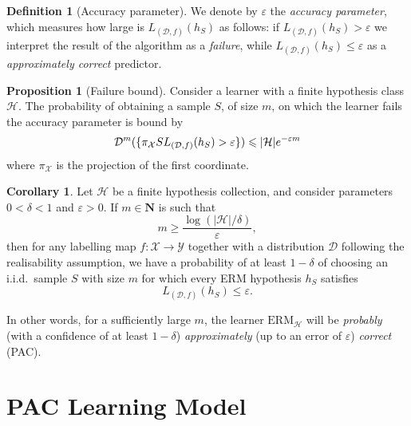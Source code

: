 \documentclass[11pt, reqno]{amsart}
\theoremstyle{definition}
\newtheorem{proposition}[theorem]{Proposition}
\newtheorem{corollary}[theorem]{Corollary}
\newtheorem{definition}[theorem]{Definition}
\renewcommand{\leq}{\leqslant}
\renewcommand{\geq}{\geqslant}
\let\colon\relax
\newcommand{\N}{\mathbf{N}}
\begin{document}
\begin{definition}[Accuracy parameter]
\label{def:accuracy-parameter}
We denote by \(\varepsilon\) the \emph{accuracy parameter}, which measures how
large is \(L_{(\mathcal{D}, f)}(h_S)\) as follows: if
\(L_{(\mathcal{D}, f)}(h_S) > \varepsilon\) we interpret the result of the
algorithm as a \emph{failure}, while
\(L_{(\mathcal{D}, f)}(h_S) \leq \varepsilon\) as a \emph{approximately correct}
predictor.
\end{definition}

\begin{proposition}[Failure bound]
\label{prop:finite-hypothesis-class-failure-bound}
Consider a learner with a finite hypothesis class \(\mathcal{H}\). The
probability of obtaining a sample \(S\), of size \(m\), on which the learner
fails the accuracy parameter is bound by
\[
\mathcal{D}^m(\{\pi_{\mathcal{X}} S \colon L_{(\mathcal{D}, f)}(h_S) > \varepsilon\})
\leq |\mathcal{H}| e^{-\varepsilon m}
\]
where \(\pi_{\mathcal{X}}\) is the projection of the first coordinate.
\end{proposition}

\begin{corollary}
\label{cor:finite-hypothesis-pac-learnability}
Let \(\mathcal{H}\) be a finite hypothesis collection, and consider parameters
\(0 < \delta < 1\) and \(\varepsilon > 0\). If \(m \in \N\) is such that
\[
m \geq \frac{\log(|\mathcal{H}| / \delta)}{\varepsilon},
\]
then for any labelling map \(f: \mathcal{X} \to \mathcal{Y}\) together with a
distribution \(\mathcal{D}\) following the realisability assumption, we have a
probability of at least \(1 - \delta\) of choosing an i.i.d.~sample \(S\) with
size \(m\) for which every ERM hypothesis \(h_S\) satisfies
\[
L_{(\mathcal{D}, f)}(h_S) \leq \varepsilon.
\]

In other words, for a sufficiently large \(m\), the learner
\(\text{ERM}_{\mathcal{H}}\) will be \emph{probably} (with a confidence of at
least \(1 - \delta\)) \emph{approximately} (up to an error of \(\varepsilon\))
\emph{correct} (PAC).
\end{corollary}

\section{PAC Learning Model}
\end{document}
